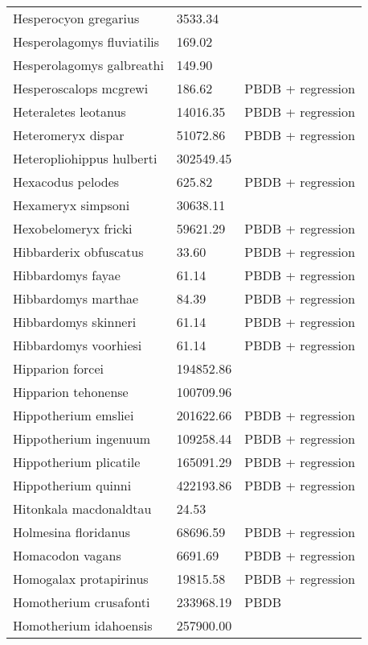 \begin{center}
\begin{longtable}{p{} p{} p{} }
  Hesperocyon gregarius & 3533.34 & \cite{Tomiya2013} \\ 
  Hesperolagomys fluviatilis & 169.02 & \cite{Tomiya2013} \\ 
  Hesperolagomys galbreathi & 149.90 & \cite{Tomiya2013} \\ 
  Hesperoscalops mcgrewi & 186.62 & PBDB + regression \\ 
  Heteraletes leotanus & 14016.35 & PBDB + regression \\ 
  Heteromeryx dispar & 51072.86 & PBDB + regression \\ 
  Heteropliohippus hulberti & 302549.45 & \cite{Tomiya2013} \\ 
  Hexacodus pelodes & 625.82 & PBDB + regression \\ 
  Hexameryx simpsoni & 30638.11 & \cite{Tomiya2013} \\ 
  Hexobelomeryx fricki & 59621.29 & PBDB + regression \\ 
  Hibbarderix obfuscatus & 33.60 & PBDB + regression \\ 
  Hibbardomys fayae & 61.14 & PBDB + regression \\ 
  Hibbardomys marthae & 84.39 & PBDB + regression \\ 
  Hibbardomys skinneri & 61.14 & PBDB + regression \\ 
  Hibbardomys voorhiesi & 61.14 & PBDB + regression \\ 
  Hipparion forcei & 194852.86 & \cite{Tomiya2013} \\ 
  Hipparion tehonense & 100709.96 & \cite{Tomiya2013} \\ 
  Hippotherium emsliei & 201622.66 & PBDB + regression \\ 
  Hippotherium ingenuum & 109258.44 & PBDB + regression \\ 
  Hippotherium plicatile & 165091.29 & PBDB + regression \\ 
  Hippotherium quinni & 422193.86 & PBDB + regression \\ 
  Hitonkala macdonaldtau & 24.53 & \cite{Tomiya2013} \\ 
  Holmesina floridanus & 68696.59 & PBDB + regression \\ 
  Homacodon vagans & 6691.69 & PBDB + regression \\ 
  Homogalax protapirinus & 19815.58 & PBDB + regression \\ 
  Homotherium crusafonti & 233968.19 & PBDB \\ 
  Homotherium idahoensis & 257900.00 & \cite{McKenna2011} \\ 

\end{longtable}
\end{center}
